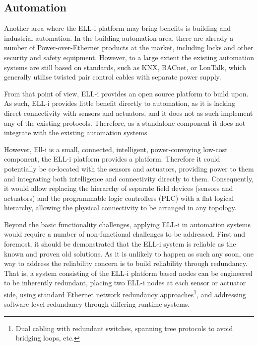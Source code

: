 \documentclass[draft,a4paper]{siamltex}
\begin{document}
\subsection{Automation}

Another area where the ELL-i platform may bring benefits is building
and industrial automation.  In the building automation area, there are
already a number of Power-over-Ethernet products at the market,
including locks and other security and safety equipment.  However, to
a large extent the existing automation systems are still based on
standards, such as KNX\cite{KNX}, BACnet\cite{BACnet}, or
LonTalk\cite{LonTalk}, which generally utilise twisted pair
control cables with separate power supply.

From that point of view, ELL-i provides an open source platform to
build upon.  As such, ELL-i provides little benefit directly to
automation, as it is lacking direct connectivity with sensors and
actuators, and it does not as such implement any of the existing
protocols.  Therefore, as a standalone component it does not integrate
with the existing automation systems.

However, Ell-i is a small, connected, intelligent, power-convoying low-cost
component, the ELL-i platform provides a platform.  Therefore it could
potentially be co-located with the sensors and actuators, providing
power to them and integrating both intelligence and connectivity
directly to them.  Consequently, it would allow replacing the
hierarchy of separate field devices (sensors and actuators) and the
programmable logic controllers (PLC) with a flat logical hierarchy,
allowing the physical connectivity to be arranged in any topology.

Beyond the basic functionality challenges, applying ELL-i in
automation systems would require a number of non-functional challenges
to be addressed.  First and foremost, it should be demonstrated that
the ELL-i system is reliable as the known and proven old solutions.
As it is unlikely to happen as such any soon, one way to address the
reliability concern is to build reliability through redundancy.  That
is, a system consisting of the ELL-i platform based nodes can be
engineered to be inherently redundant, placing two ELL-i nodes at each
sensor or actuator side, using standard Ethernet network redundancy
approaches\footnote{Dual cabling with redundant switches, spanning
  tree protocols to avoid bridging loops, etc.}, and addressing
software-level redundancy through differing runtime systems.
\end{document}
